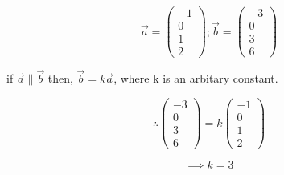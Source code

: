 

$$\overrightarrow{a} = \begin{pmatrix}
-1 \\
0 \\
1 \\
2
\end{pmatrix}; \overrightarrow{b} = \begin{pmatrix}
-3 \\
0 \\
3 \\
6
\end{pmatrix}$$

if $\overrightarrow{a} \parallel \overrightarrow{b}$ then, $\overrightarrow{b} = k\overrightarrow{a}$, where k is an arbitary constant.

$$\therefore \begin{pmatrix}
-3 \\
0 \\
3 \\
6
\end{pmatrix} = k\begin{pmatrix}
-1 \\
0 \\
1 \\
2
\end{pmatrix}$$

$$\implies k = 3$$